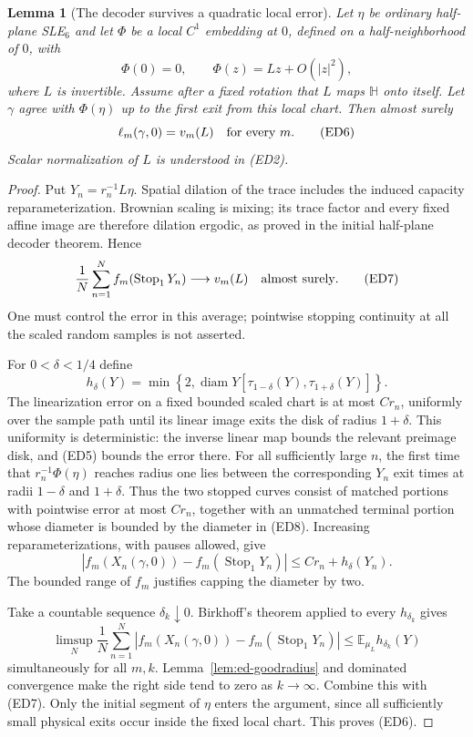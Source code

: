 \documentclass[11pt]{article}
\newtheorem{lemma}[theorem]{Lemma}
\theoremstyle{definition}\newtheorem{definition}[theorem]{Definition}
\theoremstyle{remark}\newtheorem{remark}[theorem]{Remark}
\begin{document}
\begin{lemma}[The decoder survives a quadratic local error]
\label{lem:ed-linearization}
Let $\eta$ be ordinary half-plane SLE$_6$ and let $\Phi$ be a local
$C^1$ embedding at $0$, defined on a half-neighborhood of $0$, with
\[
 \Phi(0)=0,\qquad \Phi(z)=Lz+O(|z|^2),
 \tag{ED5}
\]
where $L$ is invertible. Assume after a fixed rotation that $L$ maps
$\mathbb H$ onto itself. Let $\gamma$ agree with $\Phi(\eta)$ up to
the first exit from this local chart. Then almost surely
\[
 \ell_m(\gamma,0)=v_m(L)\quad\hbox{for every }m.
 \tag{ED6}
\]
Scalar normalization of $L$ is understood in (ED2).
\end{lemma}
\begin{proof}
Put $Y_n=r_n^{-1}L\eta$. Spatial dilation of the trace includes the
induced capacity reparameterization. Brownian scaling is mixing; its
trace factor and every fixed affine image are therefore dilation
ergodic, as proved in the initial half-plane decoder theorem. Hence
\[
 \frac1N\sum_{n=1}^N
 f_m(\operatorname{Stop}_1Y_n)\longrightarrow v_m(L)
 \quad\hbox{almost surely}.
 \tag{ED7}
\]
One must control the error in this average; pointwise stopping continuity
at all the scaled random samples is not asserted.

For $0<\delta<1/4$ define
\[
 h_\delta(Y)=\min\!\left\{2,
  \operatorname{diam}
   Y[\tau_{1-\delta}(Y),\tau_{1+\delta}(Y)]\right\}.
 \tag{ED8}
\]
The linearization error on a fixed bounded scaled chart is at most
$Cr_n$, uniformly over the sample path until its linear image exits the
disk of radius $1+\delta$. This uniformity is deterministic: the inverse
linear map bounds the relevant preimage disk, and (ED5) bounds the error
there. For all sufficiently large $n$, the first time that
$r_n^{-1}\Phi(\eta)$ reaches radius one lies between the corresponding
$Y_n$ exit times at radii $1-\delta$ and $1+\delta$.
Thus the two stopped curves consist of matched portions with pointwise
error at most $Cr_n$, together with an unmatched terminal portion whose
diameter is bounded by the diameter in (ED8). Increasing
reparameterizations, with pauses allowed, give
\[
 \left|f_m(X_n(\gamma,0))-
 f_m(\operatorname{Stop}_1Y_n)\right|
       \leq Cr_n+h_\delta(Y_n).
 \tag{ED9}
\]
The bounded range of $f_m$ justifies capping the diameter by two.

Take a countable sequence $\delta_k\downarrow0$. Birkhoff's theorem
applied to every $h_{\delta_k}$ gives
\[
 \limsup_N\frac1N\sum_{n=1}^N
 \left|f_m(X_n(\gamma,0))-
 f_m(\operatorname{Stop}_1Y_n)\right|
 \leq\mathbb E_{\mu_L}h_{\delta_k}(Y)
 \tag{ED10}
\]
simultaneously for all $m,k$. Lemma~\ref{lem:ed-goodradius} and dominated
convergence make the right side tend to zero as $k\to\infty$. Combine
this with (ED7). Only the initial segment of $\eta$ enters the argument,
since all sufficiently small physical exits occur inside the fixed local
chart. This proves (ED6).
\end{proof}
\end{document}
